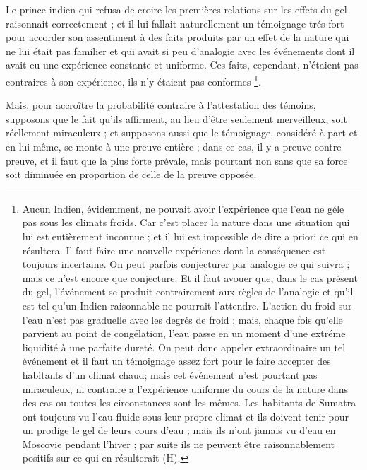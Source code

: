 Le prince indien qui refusa de croire les premières
relations sur les effets du gel raisonnait correctement ;
et il lui fallait naturellement un témoignage trés fort
pour accorder son assentiment à des faits produits par un
effet de la nature qui ne lui était pas familier et qui avait
si peu d’analogie avec les événements dont il avait eu une
expérience constante et uniforme. Ces faits, cependant,
n’étaient pas contraires à son expérience, ils n’y étaient
pas conformes \footnote{Aucun Indien, évidemment, ne pouvait avoir l’expérience
que l’eau ne géle pas sous les climats froids. Car c’est placer la
nature dans une situation qui lui est entièrement inconnue ;
et il lui est impossible de dire a priori ce qui en résultera. Il
faut faire une nouvelle expérience dont la conséquence est
toujours incertaine. On peut parfois conjecturer par analogie
ce qui suivra ; mais ce n’est encore que conjecture. Et il faut
avouer que, dans le cas présent du gel, l’événement se produit
contrairement aux règles de l’analogie et qu’il est tel qu’un
Indien raisonnable ne pourrait l’attendre. L’action du froid sur
l'eau n’est pas graduelle avec les degrés de froid ; mais, chaque
fois qu’elle parvient au point de congélation, l’eau passe en un
moment d’une extréme liquidité à une parfaite dureté. On
peut donc appeler extraordinaire un tel événement et il faut un
témoignage assez fort pour le faire accepter des habitants d’un
climat chaud; mais cet événement n’est pourtant pas miraculeux,
ni contraire a l’expérience uniforme du cours de la nature
dans des cas ou toutes les circonstances sont les mêmes. Les
habitants de Sumatra ont toujours vu l’eau fluide sous leur
propre climat et ils doivent tenir pour un prodige le gel de leurs
cours d’eau ; mais ils n’ont jamais vu d’eau en Moscovie pendant
l'hiver ; par suite ils ne peuvent être raisonnablement positifs
sur ce qui en résulterait (H).}.

Mais, pour accroître la probabilité contraire à l’attestation
des témoins, supposons que le fait qu’ils affirment,
au lieu d’être seulement merveilleux, soit réellement
miraculeux ; et supposons aussi que le témoignage, considéré
à part et en lui-même, se monte à une preuve entière ;
dans ce cas, il y a preuve contre preuve, et il faut que la
plus forte prévale, mais pourtant non sans que sa force
soit diminuée en proportion de celle de la preuve opposée.

